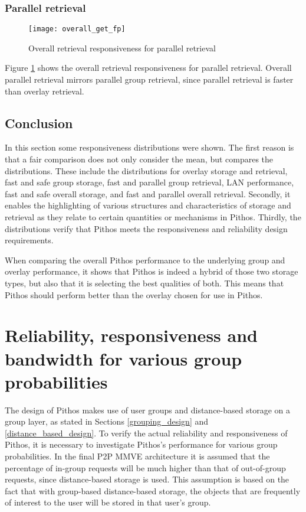 \subsubsection{Parallel retrieval}
\begin{figure}[htbp]
 \centering
 \texttt{[image: overall\_get\_fp]}
 \caption{Overall retrieval responsiveness for parallel retrieval}
 \label{fig_overall_get_fp}
\end{figure}
%
Figure \ref{fig_overall_get_fp} shows the overall retrieval responsiveness for parallel retrieval. Overall parallel retrieval mirrors parallel group retrieval, since parallel retrieval is faster than overlay retrieval.

\subsection{Conclusion}

In this section some responsiveness distributions were shown. The first reason is that a fair comparison does not only consider the mean, but compares the distributions. These include the distributions for overlay storage and retrieval, fast and safe group storage, fast and parallel group retrieval, LAN performance, fast and safe overall storage, and fast and parallel overall retrieval. Secondly, it enables the highlighting of various structures and characteristics of storage and retrieval as they relate to certain quantities or mechanisms in Pithos. Thirdly, the distributions verify that Pithos meets the responsiveness and reliability design requirements.

When comparing the overall Pithos performance to the underlying group and overlay performance, it shows that Pithos is indeed a hybrid of those two storage types, but also that it is selecting the best qualities of both. This means that Pithos should perform better than the overlay chosen for use in Pithos.

\section{Reliability, responsiveness and bandwidth for various group probabilities}
\label{group_probability_results}

The design of Pithos makes use of user groups and distance-based storage on a group layer, as stated in Sections \ref{grouping_design} and \ref{distance_based_design}. To verify the actual reliability and responsiveness of Pithos, it is necessary to investigate Pithos's performance for various group probabilities. In the final P2P MMVE architecture it is assumed that the percentage of in-group requests will be much higher than that of out-of-group requests, since distance-based storage is used. This assumption is based on the fact that with group-based distance-based storage, the objects that are frequently of interest to the user will be stored in that user's group.

